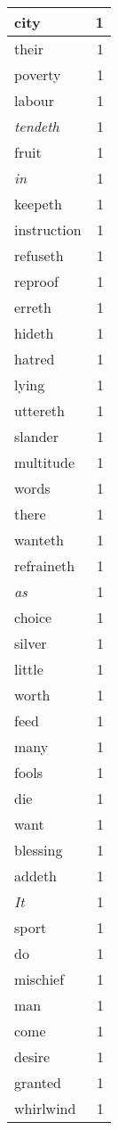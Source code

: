 \begin{center}
\begin{longtable}{l|r}
city & 1\\ \hline 
their & 1\\ \hline 
poverty & 1\\ \hline 
labour & 1\\ \hline 
\emph{tendeth} & 1\\ \hline 
fruit & 1\\ \hline 
\emph{in} & 1\\ \hline 
keepeth & 1\\ \hline 
instruction & 1\\ \hline 
refuseth & 1\\ \hline 
reproof & 1\\ \hline 
erreth & 1\\ \hline 
hideth & 1\\ \hline 
hatred & 1\\ \hline 
lying & 1\\ \hline 
uttereth & 1\\ \hline 
slander & 1\\ \hline 
multitude & 1\\ \hline 
words & 1\\ \hline 
there & 1\\ \hline 
wanteth & 1\\ \hline 
refraineth & 1\\ \hline 
\emph{as} & 1\\ \hline 
choice & 1\\ \hline 
silver & 1\\ \hline 
little & 1\\ \hline 
worth & 1\\ \hline 
feed & 1\\ \hline 
many & 1\\ \hline 
fools & 1\\ \hline 
die & 1\\ \hline 
want & 1\\ \hline 
blessing & 1\\ \hline 
addeth & 1\\ \hline 
\emph{It} & 1\\ \hline 
sport & 1\\ \hline 
do & 1\\ \hline 
mischief & 1\\ \hline 
man & 1\\ \hline 
come & 1\\ \hline 
desire & 1\\ \hline 
granted & 1\\ \hline 
whirlwind & 1\\ \hline 

\end{longtable}
\end{center}
